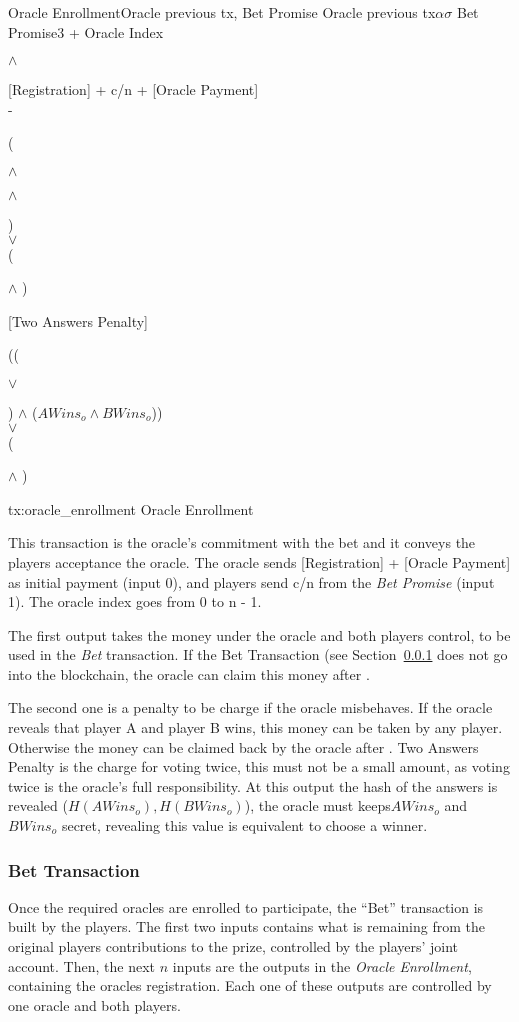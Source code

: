 \transaction%
    {Oracle Enrollment}{Oracle previous tx, Bet Promise}
    {Oracle previous tx}{$\alpha$}{$\sigma$}
    {Bet Promise}{3 + Oracle Index}{\signature{A} $\wedge$ \signature{B}}
    \stopinputs
    {[Registration] + c/n + [Oracle Payment] \\ - }
        {(\signature{Oracle} $\wedge$ \signature{A} $\wedge$ \signature{B}) \\
            $\vee$ \\
         (\signature{Oracle} $\wedge$ )}
    {[Two Answers Penalty]}{((\signature{A} $\vee$ \signature{B}) $\wedge$ %
                             ($AWins_o \wedge BWins_o$)) \\
                           $\vee$ \\
                       (\signature{Oracle} $\wedge$ )}
    \stopoutputs
    {tx:oracle_enrollment}
    {Oracle Enrollment}

This transaction is the oracle's commitment with the bet and it conveys the
  players acceptance the oracle.
The oracle sends [Registration] + [Oracle Payment] as initial payment
  (input 0), and players send c/n from the \textit{Bet Promise} (input 1).
The oracle index goes from 0 to n - 1.

The first output takes the money under the oracle and both players control, to
  be used in the \textit{Bet} transaction.
If the Bet Transaction (see Section~\ref{subsec:bet_transaction} does not go
  into the blockchain, the oracle can claim this money after .

The second one is a penalty to be charge if the oracle misbehaves.
If the oracle reveals that player A and player B wins, this money can be taken
  by any player. Otherwise the money can be claimed back by the oracle after
  .
Two Answers Penalty is the charge for voting twice, this must not be a small
  amount, as voting twice is the oracle's full responsibility.
At this output the hash of the answers is revealed ($H(AWins_o), H(BWins_o)$),
  the oracle must keeps$AWins_o$ and $BWins_o$ secret, revealing this value is
  equivalent to choose a winner.

\subsubsection{Bet Transaction} \label{subsec:bet_transaction}

Once the required oracles are enrolled to participate, the ``Bet'' transaction
  is built by the players.
 The first two inputs contains what is remaining from the original players
   contributions to the prize, controlled by the players' joint account.
Then, the next $n$ inputs are the outputs in the \textit{Oracle Enrollment},
  containing the oracles registration.
Each one of these outputs are controlled by one oracle and both players.

